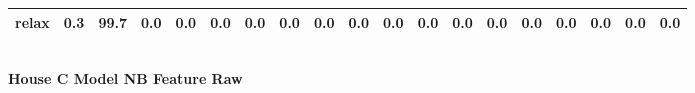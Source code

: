 \documentclass{article}
\begin{document}
\begin{sideways}
\begin{tabular}{lrrrrrrrrrrrrrrrrrr}
relax                         &         0.3 &               99.7 &           0.0 &                          0.0 &                0.0 &                0.0 &                        0.0 &          0.0 &              0.0 &                0.0 &                    0.0 &                      0.0 &                  0.0 &                   0.0 &              0.0 &              0.0 &                                  0.0 &          0.0 \\
\bottomrule
\end{tabular}
\end{sideways}
\normalsize
\vspace{1cm}\\
\textbf{House C Model NB Feature Raw}\\
\vspace{1cm}\\
\end{document}
